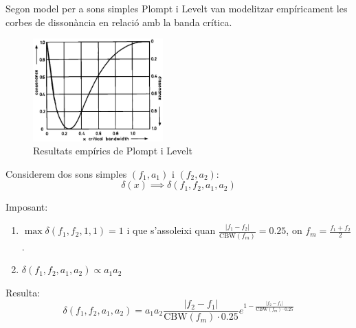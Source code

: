 \documentclass[10pt,hyperref={colorlinks,linkcolor=black,citecolor=blue!80,urlcolor=blue!60},handout]{beamer} %
\theoremstyle{definition}
\begin{document}
\begin{frame}{Segon model per a sons simples}
    Plompt i Levelt \cite{plomp} van modelitzar empíricament les corbes de dissonància en relació amb la banda crítica.
    \begin{figure}
        \centering
        \includegraphics[width=5cm,angle=-0.1]{Imatges_beamer2/plompt-levelt.png}
        \caption{Resultats empírics de Plompt i Levelt \cite{plomp}}
    \end{figure}
    \hypersetup{citecolor=black!30}
    \hypersetup{citecolor=blue!80}
\end{frame}
\begin{frame}
    Considerem dos sons simples $(f_1,a_1)$ i $(f_2,a_2)$:\pause
    $$\delta(x)\implies\delta(f_1,f_2,a_1,a_2)$$\par\pause
    Imposant:
    \begin{enumerate}
        \item $\max\delta(f_1,f_2,1,1)=1$ i que s'assoleixi quan $\frac{|f_1-f_2|}{\text{CBW}(f_m)}=0.25$, on $f_m=\frac{f_1+f_2}{2}$.\pause
        \item $\delta(f_1,f_2,a_1,a_2)\propto a_1a_2$\pause
    \end{enumerate}
    Resulta:
    \begin{equation*}
        \delta(f_1,f_2,a_1,a_2)=a_1a_2\frac{|f_2-f_1|}{\text{CBW}(f_m)\cdot 0.25}e^{1-\frac{|f_2-f_1|}{\text{CBW}(f_m)\cdot 0.25}}
    \end{equation*}
    \begin{figure}
        \centering
        
    \end{figure}
\end{frame}
\end{document}
